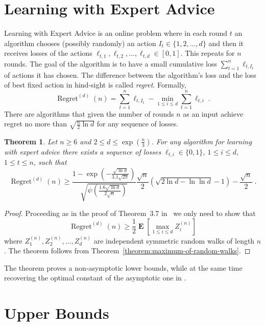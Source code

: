 \documentclass{article}
\DeclareMathOperator*{\Exp}{\mathbf{E}}
\DeclareMathOperator{\Regret}{Regret}
\newtheorem{theorem}{Theorem}
\begin{document}
\section{Learning with Expert Advice}
\label{section:experts}

Learning with Expert Advice is an online problem where in each round $t$ an
algorithm chooses (possibly randomly) an action $I_t \in \{1,2,\dots,d\}$ and
then it receives losses of the actions $\ell_{t,1}, \ell_{t,2}, \dots,
\ell_{t,d} \in [0,1]$. This repeats for $n$ rounds.  The goal of the algorithm
is to have a small cumulative loss $\sum_{t=1}^n \ell_{t,I_t}$ of
actions it has chosen. The difference between the algorithm's loss and the loss of best fixed
action in hind-sight is called \emph{regret}.  Formally,
$$
\Regret^{(d)}(n) = \sum_{t=1}^n \ell_{t,I_t} - \min_{1 \le i \le d} \sum_{t=1}^n \ell_{t,i} \; .
$$
There are algorithms that given the number of rounds $n$ as an input achieve regret no more than $\sqrt{\frac{n}{2} \ln d}$
for any sequence of losses.

\begin{theorem}
Let $n \ge 6$ and $2 \le d \le \exp(\frac{n}{3})$. For any algorithm for learning with expert advice there exists a sequence
of losses $\ell_{t,i} \in \{0,1\}$, $1 \le i \le d$, $1 \le t \le n$, such that
$$
\Regret^{(d)}(n) \ge \frac{1 - \exp\left(-\frac{\sqrt{\ln d}}{3.1 \sqrt{2\pi}}\right)}{\sqrt{\psi\left(\frac{1.6 \sqrt{\ln d}}{2 \sqrt{n}}\right)}} \frac{\sqrt{n}}{2} \left(\sqrt{2 \ln d - \ln \ln d}-1\right) - \frac{\sqrt{n}}{2} \; .
$$
\end{theorem}

\begin{proof}
Proceeding as in the proof of Theorem~3.7 in~\citep{Cesa-BianchiL06} we only need to show that
$$
\Regret^{(d)}{(n)} \ge \frac{1}{2} \Exp \left[ \max_{1 \le i \le d} Z^{(n)}_i \right]
$$
where $Z^{(n)}_1, Z^{(n)}_2, \dots, Z^{(n)}_d$ are independent symmetric random walks of length $n$. The theorem follows from Theorem~\ref{theorem:maximum-of-random-walks}.
\end{proof}

The theorem proves a non-asymptotic lower bounds, while at the same time
recovering the optimal constant of the asymptotic one in
\citet{Cesa-BianchiL06}.




\appendix

\section{Upper Bounds}
\label{section:upper-bounds}
\end{document}
